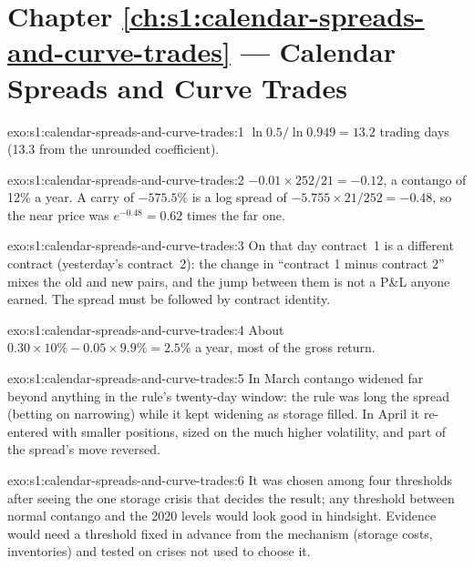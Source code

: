 \section*{Chapter \ref{ch:s1:calendar-spreads-and-curve-trades} --- Calendar Spreads and Curve Trades}

\begin{solution}{exo:s1:calendar-spreads-and-curve-trades:1}
$\ln 0.5/\ln 0.949 = 13.2$ trading days (13.3 from the unrounded coefficient).
\end{solution}

\begin{solution}{exo:s1:calendar-spreads-and-curve-trades:2}
$-0.01 \times 252/21 = -0.12$, a contango of 12\% a year. A carry of $-575.5\%$ is a log spread of $-5.755 \times 21/252 = -0.48$, so the near
price was $e^{-0.48} = 0.62$ times the far one.
\end{solution}

\begin{solution}{exo:s1:calendar-spreads-and-curve-trades:3}
On that day contract~1 is a different contract (yesterday's contract~2): the change in ``contract 1 minus contract 2'' mixes the old and new pairs, and
the jump between them is not a P\&L anyone earned. The spread must be followed by contract identity.
\end{solution}

\begin{solution}{exo:s1:calendar-spreads-and-curve-trades:4}
About $0.30 \times 10\% - 0.05 \times 9.9\% = 2.5\%$ a year, most of the gross return.
\end{solution}

\begin{solution}{exo:s1:calendar-spreads-and-curve-trades:5}
In March contango widened far beyond anything in the rule's twenty-day window: the rule was long the spread (betting on narrowing) while it kept widening
as storage filled. In April it re-entered with smaller positions, sized on the much higher volatility, and part of the spread's move reversed.
\end{solution}

\begin{solution}{exo:s1:calendar-spreads-and-curve-trades:6}
It was chosen among four thresholds after seeing the one storage crisis that decides the result; any threshold between normal contango and the 2020
levels would look good in hindsight. Evidence would need a threshold fixed in advance from the mechanism (storage costs, inventories) and tested on
crises not used to choose it.
\end{solution}

